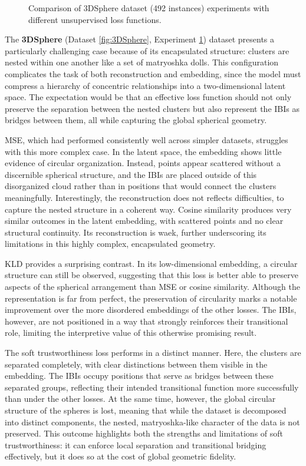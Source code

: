\begin{figure}[htbp]
  \caption{Comparison of 3DSphere dataset (492 instances) experiments with different unsupervised loss functions.}
  \label{fig:RQ2/3DSphere}
\end{figure}

The \textbf{3DSphere} (Dataset \ref{fig:3DSphere}, Experiment \ref{fig:RQ2/3DSphere}) dataset presents a particularly challenging case because of its encapsulated structure: clusters are nested within one another like a set of matryoshka dolls. This configuration complicates the task of both reconstruction and embedding, since the model must compress a hierarchy of concentric relationships into a two-dimensional latent space. The expectation would be that an effective loss function should not only preserve the separation between the nested clusters but also represent the IBIs as bridges between them, all while capturing the global spherical geometry.

MSE, which had performed consistently well across simpler datasets, struggles with this more complex case. In the latent space, the embedding shows little evidence of circular organization. Instead, points appear scattered without a discernible spherical structure, and the IBIs are placed outside of this disorganized cloud rather than in positions that would connect the clusters meaningfully. Interestingly, the reconstruction does not reflects difficulties, to capture the nested structure in a coherent way. Cosine similarity produces very similar outcomes in the latent embedding, with scattered points and no clear structural continuity. Its reconstruction is waek, further underscoring its limitations in this highly complex, encapsulated geometry.

KLD provides a surprising contrast. In its low-dimensional embedding, a circular structure can still be observed, suggesting that this loss is better able to preserve aspects of the spherical arrangement than MSE or cosine similarity. Although the representation is far from perfect, the preservation of circularity marks a notable improvement over the more disordered embeddings of the other losses. The IBIs, however, are not positioned in a way that strongly reinforces their transitional role, limiting the interpretive value of this otherwise promising result.

The soft trustworthiness loss performs in a distinct manner. Here, the clusters are separated completely, with clear distinctions between them visible in the embedding. The IBIs occupy positions that serve as bridges between these separated groups, reflecting their intended transitional function more successfully than under the other losses. At the same time, however, the global circular structure of the spheres is lost, meaning that while the dataset is decomposed into distinct components, the nested, matryoshka-like character of the data is not preserved. This outcome highlights both the strengths and limitations of soft trustworthiness: it can enforce local separation and transitional bridging effectively, but it does so at the cost of global geometric fidelity.

